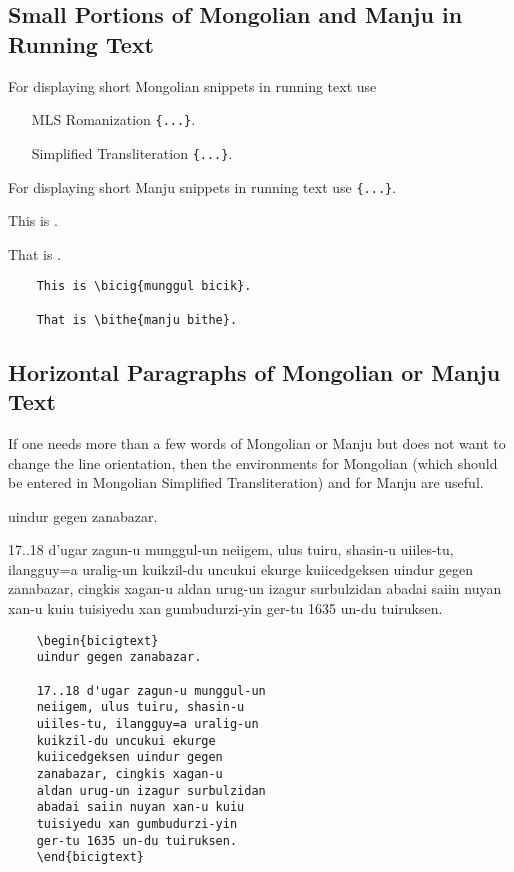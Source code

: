 \documentclass[11pt,a4paper]{article}
\begin{document}
\subsection{Small Portions of Mongolian and Manju in Running Text}

For displaying short Mongolian snippets in running text
use 
\begin{itemize}
	\item [MLS Romanization] \verb|{...}|.
	\item [Simplified Transliteration] \verb|{...}|.
\end{itemize}

For displaying short Manju snippets in running text
use \verb|{...}|.

\exa
	This is . 

	That is .
\exb
	\begin{verbatim}
	This is \bicig{munggul bicik}.
	
	That is \bithe{manju bithe}.
	\end{verbatim}
\exc

\subsection{Horizontal Paragraphs of Mongolian or Manju Text}

If one needs more than a few words of Mongolian or Manju but does
not want to change the line orientation, then the environments
 for Mongolian (which should be entered in
Mongolian Simplified Transliteration) and  for Manju are
useful.

\exa
	\begin{bicigtext}
	uindur gegen zanabazar.

	17..18 d'ugar zagun-u munggul-un
	neiigem, ulus tuiru, shasin-u uiiles-tu,
	ilangguy=a uralig-un kuikzil-du uncukui
	ekurge kuiicedgeksen uindur gegen
	zanabazar, cingkis xagan-u aldan
	urug-un izagur surbulzidan abadai
	saiin nuyan xan-u kuiu tuisiyedu xan
	gumbudurzi-yin ger-tu 1635 un-du
	tuiruksen.%
	\end{bicigtext}
\exb
	{\mdoublehyphenon
	\begin{verbatim}
	\begin{bicigtext}
	uindur gegen zanabazar.

	17..18 d'ugar zagun-u munggul-un
	neiigem, ulus tuiru, shasin-u
	uiiles-tu, ilangguy=a uralig-un
	kuikzil-du uncukui ekurge
	kuiicedgeksen uindur gegen
	zanabazar, cingkis xagan-u
	aldan urug-un izagur surbulzidan
	abadai saiin nuyan xan-u kuiu
	tuisiyedu xan gumbudurzi-yin
	ger-tu 1635 un-du tuiruksen.
	\end{bicigtext}
	\end{verbatim}}
\exc
\end{document}
